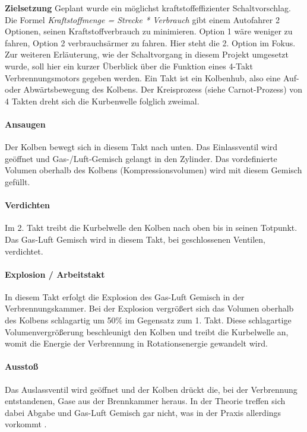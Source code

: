 \textbf{Zielsetzung\newline}
Geplant wurde ein möglichst kraftstoffeffizienter Schaltvorschlag.
Die Formel \textit{Kraftstoffmenge = Strecke * Verbrauch} gibt einem Autofahrer 2 Optionen, seinen Kraftstoffverbrauch zu minimieren. Option 1 wäre weniger zu fahren, Option 2 verbrauchsärmer zu fahren. Hier steht die 2. Option im Fokus. 
Zur weiteren Erläuterung, wie der Schaltvorgang in diesem Projekt umgesetzt wurde, soll hier ein kurzer Überblick über die Funktion eines 4-Takt Verbrennungsmotors gegeben werden. Ein Takt ist ein Kolbenhub, also eine Auf- oder Abwärtsbewegung des Kolbens. Der Kreisprozess (siehe Carnot-Prozess) von 4 Takten dreht sich die Kurbenwelle folglich zweimal.

\paragraph{Ansaugen}
Der Kolben bewegt sich in diesem Takt nach unten. Das Einlassventil wird geöffnet und Gas-/Luft-Gemisch gelangt in den Zylinder. Das vordefinierte Volumen oberhalb des Kolbens (Kompressionsvolumen) wird mit diesem Gemisch gefüllt.
\paragraph{Verdichten} 
Im 2. Takt treibt die Kurbelwelle den Kolben nach oben bis in seinen Totpunkt. Das Gas-Luft Gemisch wird in diesem Takt, bei geschlossenen Ventilen, verdichtet.
\paragraph{Explosion / Arbeitstakt}
In diesem Takt erfolgt die Explosion des Gas-Luft Gemisch in der Verbrennungskammer. Bei der Explosion vergrößert sich das Volumen oberhalb des Kolbens schlagartig um 50\% im Gegensatz zum 1. Takt. Diese schlagartige Volumenvergrößerung beschleunigt den Kolben und treibt die Kurbelwelle an, womit die Energie der Verbrennung in Rotationsenergie gewandelt wird. 
\paragraph{Ausstoß}
Das Auslassventil wird geöffnet und der Kolben drückt die, bei der Verbrennung entstandenen, Gase aus der Brennkammer heraus. In der Theorie treffen sich dabei Abgabe und Gas-Luft Gemisch gar nicht, was in der Praxis allerdings vorkommt \cite{SIMR.CH2-motorwirkungsgrad.4strokeEngine}.

